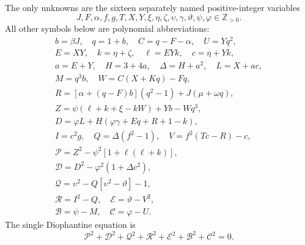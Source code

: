 The only unknowns are the sixteen separately named positive-integer variables
\[
J,F,\alpha,f,g,T,X,Y,\xi,\eta,\zeta,\upsilon,\gamma,\vartheta,\psi,\varphi\in\mathbb Z_{>0}.
\]
All other symbols below are polynomial abbreviations:
\[
\begin{gathered}
b=\beta J,\quad q=1+b,\quad C=q-F-\alpha,\quad U=Yq^2,\\
E=XY,\quad k=\eta+\zeta,\quad \ell=EYk,\quad c=\eta+Yk,\\
a=E+Y,\quad H=3+4a,\quad\Delta=H+a^2,\quad L=X+ac,\\
M=q^3b,\quad W=C(X+Kq)-Fq,\\
R=[\alpha+(q-F)b](q^2-1)+J(\mu+\omega q),\\
Z=\psi(\ell+k+\xi-kW)+Yb-Wq^3,\\
D=\varphi L+H(\varphi\gamma+Eq+R+1-k),\\
I=c^2g,\quad Q=\Delta(f^2-1),\quad V=f^2(Tc-R)-c,\\
\mathcal{P}=Z^2-\psi^2[1+\ell(\ell+k)],\\
\mathcal{D}=D^2-\varphi^2(1+\Delta c^2),\\
\mathcal{Q}=\upsilon^2-Q[\upsilon^2-\vartheta]-1,\\
\mathcal{R}=I^2-Q,\quad \mathcal{E}=\vartheta-V^2,\\
\mathcal{B}=\psi-M,\quad \mathcal{C}=\varphi-U.
\end{gathered}
\]
The single Diophantine equation is
\[
\boxed{\mathcal{P}^2+\mathcal{D}^2+\mathcal{Q}^2+\mathcal{R}^2+\mathcal{E}^2+\mathcal{B}^2+\mathcal{C}^2=0.}
\]
